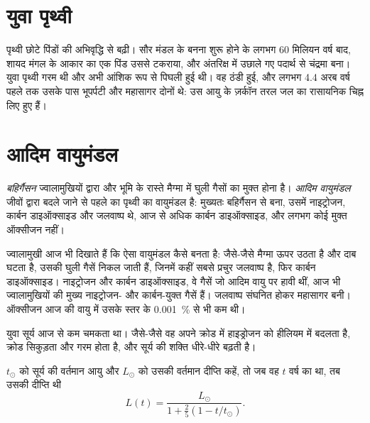 \section{युवा पृथ्वी}

पृथ्वी छोटे पिंडों की अभिवृद्धि से बढ़ी। सौर मंडल के बनना शुरू होने के लगभग 60 मिलियन वर्ष
बाद, शायद मंगल के आकार का एक पिंड उससे टकराया,
और अंतरिक्ष में उछाले गए पदार्थ से चंद्रमा बना। युवा पृथ्वी
गरम थी और अभी आंशिक रूप से पिघली हुई थी। वह ठंडी हुई, और लगभग 4.4 अरब वर्ष पहले तक उसके
पास भूपर्पटी और महासागर दोनों थे: उस आयु के ज़र्कॉन तरल जल का रासायनिक
चिह्न लिए हुए हैं।

\section{आदिम वायुमंडल}

\begin{definition}[बहिर्गैसन; आदिम वायुमंडल]\label{def:g12:early-earth:primitive-atmosphere}
\emph{बहिर्गैसन} ज्वालामुखियों द्वारा और भूमि के रास्ते
मैग्मा में घुली गैसों का मुक्त होना है। \emph{आदिम
वायुमंडल} जीवों द्वारा बदले जाने से पहले का पृथ्वी का
वायुमंडल है: मुख्यतः बहिर्गैसन से बना, उसमें नाइट्रोजन,
कार्बन डाइऑक्साइड और जलवाष्प थे, आज से अधिक कार्बन डाइऑक्साइड, और लगभग
कोई मुक्त ऑक्सीजन नहीं।
\end{definition}

ज्वालामुखी आज भी दिखाते हैं कि ऐसा वायुमंडल कैसे बनता है: जैसे-जैसे मैग्मा ऊपर उठता है और
दाब घटता है, उसकी घुली गैसें निकल जाती हैं, जिनमें कहीं सबसे प्रचुर
जलवाष्प है, फिर कार्बन डाइऑक्साइड। नाइट्रोजन और कार्बन डाइऑक्साइड, वे गैसें
जो आदिम वायु पर हावी थीं, आज भी ज्वालामुखियों की मुख्य नाइट्रोजन- और
कार्बन-युक्त गैसें हैं। जलवाष्प संघनित होकर
महासागर बनी। ऑक्सीजन आज की वायु में उसके स्तर के \qty{0.001}{\percent} से भी कम
थी।

युवा सूर्य आज से कम चमकता था। जैसे-जैसे वह अपने क्रोड में हाइड्रोजन को
हीलियम में बदलता है, क्रोड सिकुड़ता और गरम होता है, और सूर्य की शक्ति
धीरे-धीरे बढ़ती है।

\begin{proposition}[युवा सूर्य की दीप्ति]\label{prop:g12:early-earth:luminosity}
$t_\odot$ को सूर्य की वर्तमान आयु और $L_\odot$ को उसकी वर्तमान
दीप्ति कहें, तो जब वह $t$ वर्ष का था, तब उसकी दीप्ति थी
\[
  L(t) = \frac{L_\odot}{1 + \frac{2}{5}\left(1 - t/t_\odot\right)} .
\]
\end{proposition}

